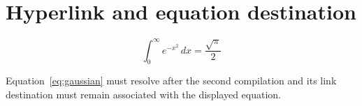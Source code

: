 \documentclass[twocolumn]{article}
\begin{document}
\section{Hyperlink and equation destination}
\WBTextA
\begin{wideband}
\begin{equation}\label{eq:gaussian}
 \int_0^\infty e^{-x^2}\,dx=\frac{\sqrt\pi}{2}
\end{equation}
\end{wideband}
Equation~\ref{eq:gaussian} must resolve after the second compilation and its
link destination must remain associated with the displayed equation.
\WBTextB\WBTextC
\end{document}
